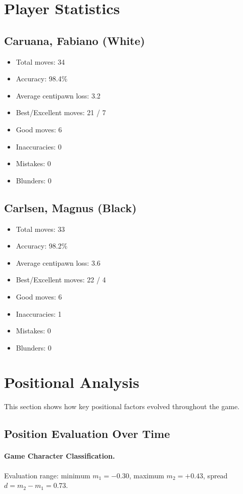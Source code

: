 \documentclass[11pt]{book}
\begin{document}
\section{Player Statistics}

\subsection{Caruana, Fabiano (White)}
\begin{itemize}
\item Total moves: 34
\item Accuracy: 98.4\%
\item Average centipawn loss: 3.2
\item Best/Excellent moves: 21 / 7
\item Good moves: 6
\item Inaccuracies: 0
\item Mistakes: 0
\item Blunders: 0
\end{itemize}

\subsection{Carlsen, Magnus (Black)}
\begin{itemize}
\item Total moves: 33
\item Accuracy: 98.2\%
\item Average centipawn loss: 3.6
\item Best/Excellent moves: 22 / 4
\item Good moves: 6
\item Inaccuracies: 1
\item Mistakes: 0
\item Blunders: 0
\end{itemize}

\section{Positional Analysis}

This section shows how key positional factors evolved throughout the game.

\subsection{Position Evaluation Over Time}

\paragraph{Game Character Classification.}
Evaluation range: minimum $m_1 = -0.30$, maximum $m_2 = +0.43$, spread $d = m_2 - m_1 = 0.73$.
\end{document}
